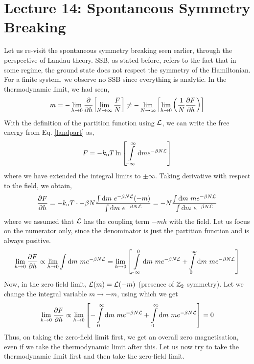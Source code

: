 \section*{Lecture 14: Spontaneous Symmetry Breaking}
Let us re-visit the spontaneous symmetry breaking seen earlier, through the perspective of Landau theory. SSB, as stated before, refers to the fact that in some regime, the ground state does not respect the symmetry of the Hamiltonian. For a finite system, we observe no SSB since everything is analytic. In the thermodynamic limit, we had seen, 
$$ m =- \lim\limits_{h\to 0} \pdv{h}\qty[\lim\limits_{N\to \infty} \frac{F}{N}] \neq - \lim\limits_{N\to \infty} \qty[\lim\limits_{h\to 0} \qty(\frac{1}{N}\pdv{F}{h})]$$
With the definition of the partition function using $\mathcal L$, we can write the free energy from Eq. \eqref{landpart} as, 
\begin{equation}
    F = -k_{\text{\tiny B}} T \ln \qty[\int\limits_{-\infty}^{\infty} \dd m e^{-\beta N \mathcal L}]
\end{equation}
where we have extended the integral limits to $\pm \infty$. Taking derivative with respect to the field, we obtain,
\begin{equation}
    \pdv{F}{h} = -k_{\text{\tiny B}} T \cdot -\beta N \frac{\int \dd m\ e^{-\beta N \mathcal L} (-m)}{\int \dd m\ e^{-\beta N \mathcal L}} = -N\frac{\int \dd m\ m e^{-\beta N \mathcal L}}{\int \dd m\ e^{-\beta N \mathcal L}}
\end{equation}
where we assumed that $\mathcal L$ has the coupling term $-mh$ with the field. Let us focus on the numerator only, since the denominator is just the partition function and is always positive. 
\begin{equation}
    \lim\limits_{h\to 0} \pdv{F}{h} \propto   \lim\limits_{h\to 0} \int \dd m\ me^{-\beta N \mathcal L} =  \lim\limits_{h\to 0}\qty[\int\limits_{-\infty}^0 \dd m\ me^{-\beta N \mathcal L}+\int\limits_{0}^\infty \dd m\ me^{-\beta N \mathcal L}]
\end{equation}
Now, in the zero field limit, $\mathcal L(m) = \mathcal L(-m)$ (presence of $\mathbb{Z}_2$ symmetry). Let we change the integral variable $m\to -m$, using which we get 
\begin{equation}
    \lim\limits_{h\to 0} \pdv{F}{h} \propto   \lim\limits_{h\to 0}\qty[-\int\limits_{0}^\infty \dd m\ me^{-\beta N \mathcal L}+\int\limits_{0}^\infty \dd m\ me^{-\beta N \mathcal L}] = 0
\end{equation}
Thus, on taking the zero-field limit first, we get an overall zero magnetisation, even if we take the thermodynamic limit after this. Let us now try to take the thermodynamic limit first and then take the zero-field limit. 
